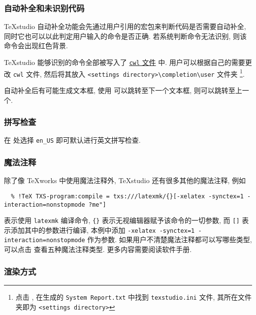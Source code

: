 \subsubsection{自动补全和未识别代码}

\TeX studio 自动补全功能会先通过用户引用的宏包来判断代码是否需要自动补全, 
同时它也可以以此判定用户输入的命令是否正确.
若系统判断命令无法识别,
则该命令会出现红色背景.

\TeX studio 能够识别的命令全部被写入了
\href{https://github.com/texstudio-org/texstudio/tree/master/completion}{\texttt{cwl} 文件}
中. 
用户可以根据自己的需要更改 \texttt{cwl} 文件,
然后将其放入
\texttt{<settings directory>\textbackslash completion\textbackslash user}
文件夹%
\footnote{点击 ,
在生成的 \texttt{System Report.txt} 中找到 \texttt{texstudio.ini} 文件,
其所在文件夹即为 \texttt{<settings directory>}}. 

自动补全后有可能生成文本框,
使用 \keys{\ctrl + \arrowkey{>}} 可以跳转至下一个文本框,
\keys{\ctrl + \arrowkey{<}} 则可以跳转至上一个. 

\subsubsection{拼写检查}

在
处选择 \texttt{en\_US} 即可默认进行英文拼写检查.

\subsubsection{魔法注释}

除了像 \TeX works 中使用魔法注释外, \TeX studio 还有很多其他的魔法注释, 例如
\begin{lstlisting}
  % !TeX TXS-program:compile = txs:///latexmk/{}[-xelatex -synctex=1 -interaction=nonstopmode ?me"]
\end{lstlisting}
表示使用 \texttt{latexmk} 编译命令,
\texttt{\{\}} 表示无视编辑器赋予该命令的一切参数,
而 \texttt{[]} 表示添加其中的参数进行编译,
本例中添加 \texttt{-xelatex -synctex=1 -interaction=nonstopmode} 作为参数.
如果用户不清楚魔法注释都可以写哪些类型,
可以点击  查看五种魔法注释类型.
更多内容需要阅读软件手册.

\subsubsection{渲染方式}

